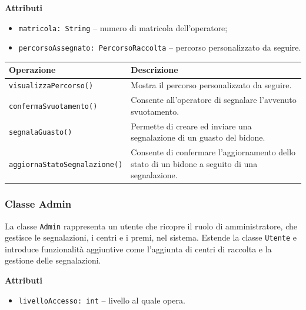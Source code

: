 \documentclass[12pt,a4paper]{article}
\begin{document}
\textbf{Attributi}
\begin{itemize}
    \item \texttt{matricola: String} -- numero di matricola dell'operatore;
    \item \texttt{percorsoAssegnato: \texttt{PercorsoRaccolta}} -- percorso personalizzato da seguire.
\end{itemize}

\begin{table}[H]
\centering
\begin{tabularx}{\textwidth}{@{}lX@{}}
\toprule
\textbf{Operazione} & \textbf{Descrizione} \\ \midrule
\texttt{visualizzaPercorso()} & Mostra il percorso personalizzato da seguire. \\
\texttt{confermaSvuotamento()} & Consente all'operatore di segnalare l'avvenuto svuotamento. \\
\texttt{segnalaGuasto()} & Permette di creare ed inviare una segnalazione di un guasto del bidone. \\
\texttt{aggiornaStatoSegnalazione()} & Consente di confermare l'aggiornamento dello stato di un bidone a seguito di una segnalazione. \\
\bottomrule
\end{tabularx}
\end{table}

\subsubsection{Classe Admin}
La classe \texttt{Admin} rappresenta un utente che ricopre il ruolo di amministratore, che gestisce le segnalazioni, i centri e i premi, nel sistema. 
Estende la classe \texttt{Utente} e introduce funzionalità aggiuntive come l'aggiunta di centri di raccolta e la gestione delle segnalazioni.

\textbf{Attributi}
\begin{itemize}
    \item \texttt{livelloAccesso: int} -- livello al quale opera.
\end{itemize}
\end{document}
